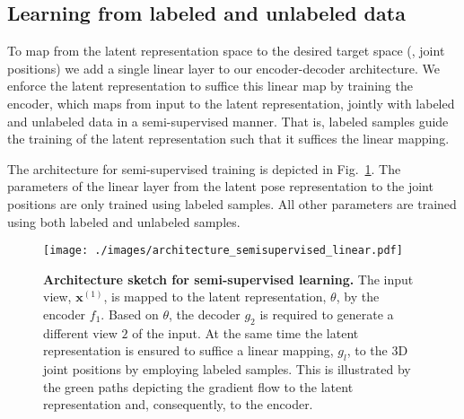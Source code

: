 \documentclass[10pt,twocolumn,letterpaper]{article}
\begin{document}
\subsection{Learning from labeled and unlabeled data}\label{sec:met:semisupervised}
To map from the latent representation space to the desired target space (\eg, joint positions) 
we add a single linear layer to our encoder-decoder architecture.
We enforce the latent representation to suffice this linear map
by training the encoder, which maps from input to the latent representation, 
jointly with labeled and unlabeled data in a semi-supervised manner.
That is, labeled samples guide the training of the latent representation 
such that it suffices the linear mapping.

The architecture for semi-supervised training is depicted in 
Fig.~\ref{fig:semisupervisedarchitecture}.
The parameters of the linear layer from the latent pose representation 
to the joint positions are only trained using labeled samples. 
All other parameters are trained using both labeled and unlabeled samples.

\begin{figure}[t]
  \centering
  \texttt{[image: ./images/architecture\_semisupervised\_linear.pdf]}
  \caption[]{\textbf{Architecture sketch for semi-supervised learning.}
  The input view, $\mathbf{x}^{(1)}$, is mapped to the 
  \textcolor{blue_ours}{latent representation}, $\theta$, 
  by the encoder $f_{1}$.
  Based on $\theta$, 
  the decoder $g_{2}$ is required to generate a different view $2$ of the input.
  At the same time the latent representation is ensured to suffice a 
  linear mapping, $g_{l}$, to the 3D joint positions by employing labeled samples.
  This is illustrated by the green paths depicting the \textcolor{green_ours}{gradient flow} 
  to the latent representation and, consequently, to the encoder.}
  \label{fig:semisupervisedarchitecture}
\end{figure}
\end{document}

